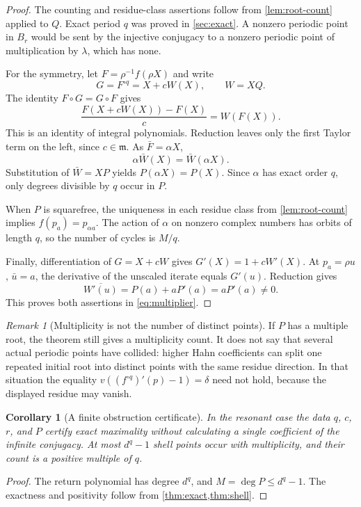 \documentclass[11pt,letterpaper]{article}
\numberwithin{equation}{section}
\theoremstyle{plain}
\newtheorem{corollary}[theorem]{Corollary}
\theoremstyle{definition}
\theoremstyle{remark}
\newtheorem{remark}[theorem]{Remark}
\newcommand{\mm}{\mathfrak m}
\begin{document}
\begin{proof}
The counting and residue-class assertions follow from
\cref{lem:root-count} applied to $Q$. Exact period $q$ was proved in
\cref{sec:exact}. A nonzero periodic point in $B_r$ would be sent by the
injective conjugacy to a nonzero periodic point of multiplication by
$\lambda$, which has none.

For the symmetry, let $F=\rho^{-1}f(\rho X)$ and write
\[
 G=F^{\circ q}=X+cW(X),\qquad W=XQ.
\]
The identity $F\circ G=G\circ F$ gives
\[
 \frac{F(X+cW(X))-F(X)}c=W(F(X)).
\]
This is an identity of integral polynomials. Reduction leaves only the
first Taylor term on the left, since $c\in\mm$. As $\bar F=\alpha X$,
\[
 \alpha\bar W(X)=\bar W(\alpha X).
\]
Substitution of $\bar W=XP$ yields $P(\alpha X)=P(X)$. Since $\alpha$
has exact order $q$, only degrees divisible by $q$ occur in $P$.

When $P$ is squarefree, the uniqueness in each residue class from
\cref{lem:root-count} implies $f(p_a)=p_{\alpha a}$. The action of
$\alpha$ on nonzero complex numbers has orbits of length $q$, so the
number of cycles is $M/q$.

Finally, differentiation of $G=X+cW$ gives
$G'(X)=1+cW'(X)$. At $p_a=\rho u$, $\bar u=a$, the derivative of the
unscaled iterate equals $G'(u)$. Reduction gives
\[
 \overline{W'(u)}=P(a)+aP'(a)=aP'(a)\ne0.
\]
This proves both assertions in \eqref{eq:multiplier}.
\end{proof}

\begin{remark}[Multiplicity is not the number of distinct points]
If $P$ has a multiple root, the theorem still gives a multiplicity count.
It does not say that several actual periodic points have collided: higher
Hahn coefficients can split one repeated initial root into distinct points
with the same residue direction. In that situation the equality
$v((f^{\circ q})'(p)-1)=\delta$ need not hold, because the displayed residue
may vanish.
\end{remark}

\begin{corollary}[A finite obstruction certificate]\label{cor:finite-certificate}
In the resonant case the data $q$, $c$, $r$, and $P$ certify exact maximality
without calculating a single coefficient of the infinite conjugacy. At most
$d^q-1$ shell points occur with multiplicity, and their count is a positive
multiple of $q$.
\end{corollary}

\begin{proof}
The return polynomial has degree $d^q$, and $M=\deg P\le d^q-1$.
The exactness and positivity follow from \cref{thm:exact,thm:shell}.
\end{proof}
\end{document}

